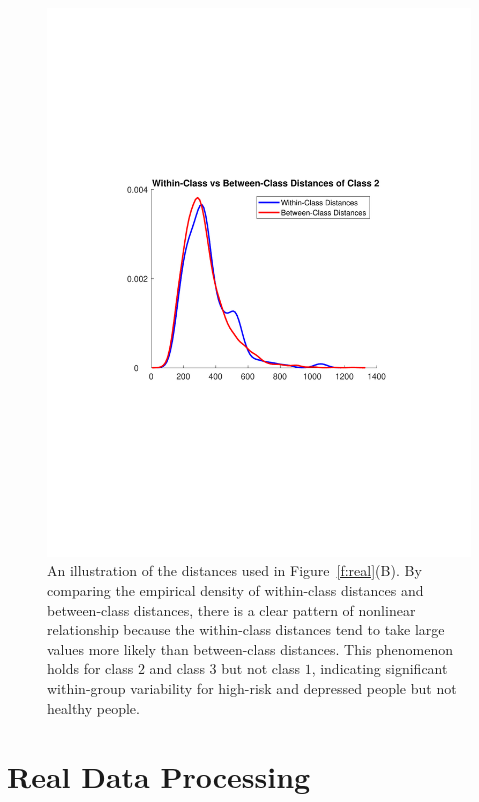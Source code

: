 \documentclass[11pt]{article}
\begin{document}
\begin{figure}[htbp]
\includegraphics[width=1.0\textwidth,trim={0cm 8cm 0cm 8cm},clip]{Figures/FigReal2A}
\caption{An illustration of the distances used in Figure~\ref{f:real}(B). By comparing the empirical density of within-class distances and between-class distances, there is a clear pattern of nonlinear relationship because the within-class distances tend to take large values more likely than between-class distances. This phenomenon holds for class $2$ and class $3$ but not class $1$, indicating significant within-group variability for high-risk and depressed people but not healthy people.}
\label{f:real2A}
\end{figure}

\clearpage
\section{Real Data Processing}
\label{appen:real}
\end{document}
